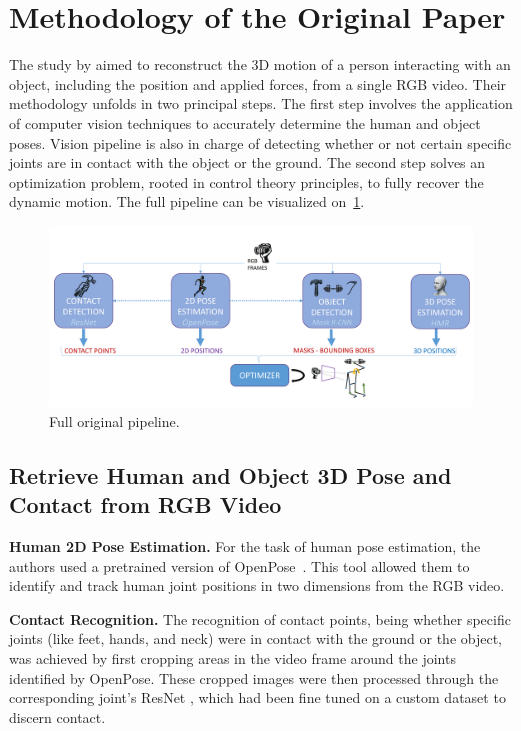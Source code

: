 \section{Methodology of the Original Paper}
\label{sec:methodo_paper}

The study by \citet{li2019estimating} aimed to reconstruct the 3D motion of a person interacting with an object, including the position 
and applied forces, from a single RGB video. Their methodology unfolds in two principal steps. The first step involves the application of 
computer vision techniques to accurately determine the human and object poses. 
Vision pipeline is also in charge of detecting whether or not certain specific joints are in contact with the object or the ground.
The second step solves an optimization problem, rooted in control theory principles, to fully recover 
the dynamic motion. The full pipeline can be visualized on~\cref{fig:original_pipeline}.

\begin{figure}
    \centering
    \includegraphics[width=12cm]{figures/authors_original_pipeline.png}
    \caption{Full original pipeline.}
    \label{fig:original_pipeline}
\end{figure}


\subsection{Retrieve Human and Object 3D Pose and Contact from RGB Video}
\label{subsec:retrieve_original}

\noindent\textbf{Human 2D Pose Estimation.}\label{2dpose} For the task of human pose estimation, the authors used a pretrained version of 
OpenPose~\cite{cao2017realtime}. This tool allowed them to identify and track human joint positions in two dimensions from the RGB video.

\noindent\textbf{Contact Recognition.} The recognition of contact points, being whether specific joints (like feet, hands, and neck) were in 
contact with the ground or the object, was achieved by first cropping areas in the video frame around the joints identified by OpenPose. 
These cropped images were then processed through the corresponding joint's ResNet \cite{he2016deep}, which had been fine tuned on a custom dataset 
to discern contact.


